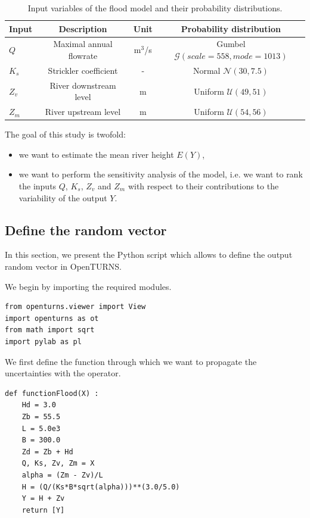 \documentclass{uncecomp2019}
\begin{document}
\begin{table}
  \begin{center}
   \begin{tabular}{lccc}
   \hline
Input & Description & Unit & Probability distribution \\
   \hline
 $Q$ & Maximal annual flowrate & m$^3$/s & Gumbel ${\mathcal G}(scale = 558, mode = 1013)$ \\
 $K_s$ & Strickler coefficient & - & Normal ${\mathcal N}(30, 7.5)$  \\
 $Z_v$ & River downstream level & m & Uniform  ${\mathcal U}(49, 51)$ \\
 $Z_m$ & River upstream level  & m  & Uniform  ${\mathcal U}(54, 56)$\\
\hline
    \end{tabular}
    \caption{Input variables of the flood model and their probability distributions.}
    \label{tab:factors}
  \end{center}
\end{table}

The goal of this study is twofold:
\begin{itemize}
\item we want to estimate the mean river height $E(Y)$, 
\item we want to perform the sensitivity analysis of the model, i.e. 
we want to rank the inputs $Q$, $K_s$, $Z_v$ and $Z_m$ with respect to their contributions 
to the variability of the output $Y$.
\end{itemize}


\subsection{Define the random vector}

In this section, we present the Python script which allows to define the 
output random vector in OpenTURNS. 

We begin by importing the required modules.
\lstset{language=Python}
\begin{lstlisting}
from openturns.viewer import View
import openturns as ot
from math import sqrt
import pylab as pl
\end{lstlisting}


We first define the function through which we want to propagate the 
uncertainties with the  operator.

\lstset{language=Python}
\begin{lstlisting}
def functionFlood(X) :
    Hd = 3.0
    Zb = 55.5
    L = 5.0e3
    B = 300.0
    Zd = Zb + Hd
    Q, Ks, Zv, Zm = X
    alpha = (Zm - Zv)/L
    H = (Q/(Ks*B*sqrt(alpha)))**(3.0/5.0)
    Y = H + Zv
    return [Y]
\end{lstlisting}
\end{document}
